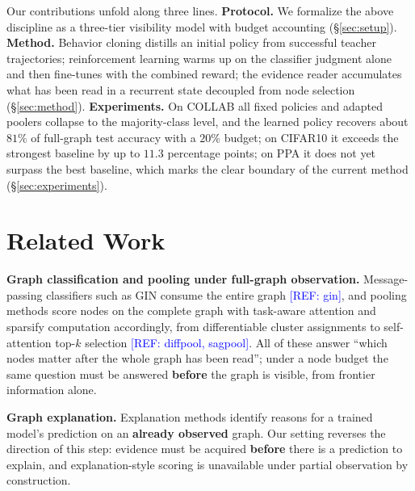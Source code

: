 \documentclass{article}
\newcommand{\refadd}[1]{\textcolor{blue}{[REF: #1]}}
\begin{document}
Our contributions unfold along three lines. \textbf{Protocol.} We formalize the above discipline as a three-tier visibility model with budget accounting (\S\ref{sec:setup}). \textbf{Method.} Behavior cloning distills an initial policy from successful teacher trajectories; reinforcement learning warms up on the classifier judgment alone and then fine-tunes with the combined reward; the evidence reader accumulates what has been read in a recurrent state decoupled from node selection (\S\ref{sec:method}). \textbf{Experiments.} On COLLAB all fixed policies and adapted poolers collapse to the majority-class level, and the learned policy recovers about $81\%$ of full-graph test accuracy with a $20\%$ budget; on CIFAR10 it exceeds the strongest baseline by up to $11.3$ percentage points; on PPA it does not yet surpass the best baseline, which marks the clear boundary of the current method (\S\ref{sec:experiments}).

\section{Related Work}
\label{sec:related}

\textbf{Graph classification and pooling under full-graph observation.} Message-passing classifiers such as GIN consume the entire graph \refadd{gin}, and pooling methods score nodes on the complete graph with task-aware attention and sparsify computation accordingly, from differentiable cluster assignments to self-attention top-$k$ selection \refadd{diffpool, sagpool}. All of these answer ``which nodes matter after the whole graph has been read''; under a node budget the same question must be answered \textbf{before} the graph is visible, from frontier information alone.

\textbf{Graph explanation.} Explanation methods identify reasons for a trained model's prediction on an \textbf{already observed} graph. Our setting reverses the direction of this step: evidence must be acquired \textbf{before} there is a prediction to explain, and explanation-style scoring is unavailable under partial observation by construction.
\end{document}

